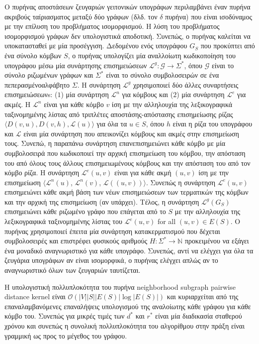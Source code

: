 Ο πυρήνας αποστάσεων ζευγαριών γειτονικών υπογράφων περιλαμβάνει έναν πυρήνα ακριβούς ταίριασματος μεταξύ δύο γράφων (δλδ. τον $\delta$ πυρήνα) που είναι ισοδύναμος με την επίλυση του προβλήματος ισομορφισμού.
Η λύση του προβλήματος ισομορφισμού γράφων δεν υπολογιστικά αποδοτική.
Συνεπώς, ο πυρήνας καλείται να υποκατασταθεί με μία προσέγγιση.
Δεδομένου ενός υπογράφου $G_S$ που προκύπτει από ένα σύνολο κόμβων $S$, ο πυρήνας υπολογίζει μία αναλλοίωτη κωδικοποίηση του υπογράφου μέσω μία συνάρτησης επισημειώσεων $\mathcal{L}^g : \mathcal{G} \rightarrow \Sigma^*$, όπου $\mathcal{G}$ είναι το σύνολο ριζωμένων γράφων και $\Sigma^*$ είναι το σύνολο συμβολοσειρών σε ένα πεπερασμένοαλφάβητο $\Sigma$.
Η συνάρτηση $\mathcal{L}^g$ χρησιμοποιεί δύο άλλες συναρτήσεις επισημειώσεωνs: ($1$) μία συνάρτηση $\mathcal{L}^n$ για κόμβους και ($2$) μία συνάρτηση $\mathcal{L}^e$ για ακμές.
Η $\mathcal{L}^n$ είναι για κάθε κόμβο $v$ ίση με την αλληλουχία της λεξικογραφικά ταξινομημένης λίστας από τριπλέτες αποστάσης-απόστασης επισημείωσης ρίζας $\langle D(v,u), D(v,h), \mathcal{L}(u) \rangle$ για όλα τα $u \in S$, όπου $h$ είναι η ρίζα του υπογράφου και $\mathcal{L}$ είναι μία συνάρτηση που απεικονίζει κόμβους και ακμές στην επισημείωση τους.
Συνεπώ, η παραπάνω συνάρτηση επανεπισημειώνει κάθε κόμβο με μία συμβολοσειρά που κωδικοποιεί την αρχική επισημείωση του κόμβου, την απόσταση του από όλους τους άλλους επισημειωμένους κόμβους και την απόσταση του από τον κόμβο ρίζα.
Η συνάρτηση $\mathcal{L}^e(u,v)$ είναι για κάθε ακμή $(u,v)$ ίση με την επισημείωση $\langle \mathcal{L}^n(u)$, $\mathcal{L}^n(v)$, $\mathcal{L}((u,v)) \rangle$.
Συνεπώς η συνάρτηση $\mathcal{L}^e(u,v)$ επισημειώνει κάθε ακμή βάση των νέων επισημειώσεων των τερματικών της κόμβων και την αρχική της επισημείωση (αν υπάρχει).
Τέλος, η συνάρτηση $\mathcal{L}^g(G_S)$ επισημειώνει κάθε ριζωμένο γράφο που επάγεται από το $S$ με την αλληλουχία της λεξικογραφικά ταξινομημένης λίστας του $\mathcal{L}^e(u,v)$ for all $(u,v) \in E(S)$.
Ο πυρήνας χρησιμοποιεί έπειτα μία συνάρτηση κατακερματισμού που δέχεται συμβολοσειρές και επιστρέφει φυσικούς αριθμούς $H : \Sigma^* \rightarrow \mathbb{N}$ προκειμένου να εξάγει ένα μοναδικό αναγνωριστικό για κάθε υπογράφο.
Συνεπώς, αντί να ελέγχει για όλα τα ζευγάρια υπογράφων αν είναι ισομορφικά, ο πυρήνας ελέγχει απλώς αν το αναγνωριστικό όλων των ζευγαριών ταυτίζεται.

Η υπολογιστική πολλυπλοκότητα του πυρήνα neighborhood subgraph pairwise distance kernel είναι $\mathcal{O}(|V| |S| |E(S)| \log |E(S)|)$ και κυριαρχείται από της επαναλαμβανόμενες επαναλήψεις υπολογισμού της αναλοίωτης κάθε γράφου για κάθε κόμβο του.
Συνεπώς για μικρές τιμές των $d^*$ και $r^*$ είναι μία διαδικασία σταθερού χρόνου και συνεπώς η συνολική πολλυπλοκότητα του αλγορίθμου στην πράξη είναι γραμμική ως προς το μέγεθος του γράφου.


